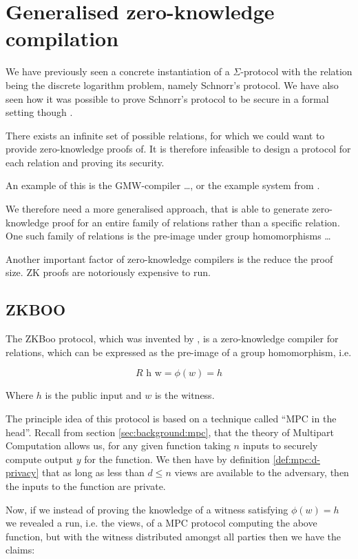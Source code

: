 \chapter{Generalised zero-knowledge compilation}
\label{ch:general_zk}
We have previously seen a concrete instantiation of a $\Sigma$-protocol with the
relation being the discrete logarithm problem, namely Schnorr's protocol. We
have also seen how it was possible to prove Schnorr's protocol to be secure in a
formal setting though \easycrypt.


There exists an infinite set of possible relations, for which we could want to
provide zero-knowledge proofs of. It is therefore infeasible to design a
protocol for each relation and proving its security.

An example of this is the GMW-compiler \dots, or the example system from \cite{zkcrypt}.

We therefore need a more generalised approach, that is able to generate
zero-knowledge proof for an entire family of relations rather than a specific relation.
One such family of relations is the pre-image under group homomorphisms \dots

Another important factor of zero-knowledge compilers is the reduce the proof
size. ZK proofs are notoriously expensive to run.

\section{ZKBOO}
\label{sec:zkboo}
The ZKBoo protocol, which was invented by \citet{zkboo}, is a zero-knowledge compiler for relations, which can be
expressed as the pre-image of a group homomorphism, i.e.

\[
  R \text{ h w} = \phi(w) = h
\]

Where $h$ is the public input and $w$ is the witness.

The principle idea of this protocol is based on a technique called ``MPC in the
head''. Recall from section \ref{sec:background:mpc}, that the theory of
Multipart Computation allows us, for any given function taking $n$ inputs to
securely compute output $y$ for the function. We then have by definition
\ref{def:mpc:d-privacy} that as long as less than $d \leq n$ views are available to the adversary, then the inputs to the function are private.

Now, if we instead of proving the knowledge of a witness satisfying $\phi(w) = h$
we revealed a run, i.e. the views, of a MPC protocol computing the above
function, but with the witness distributed amongst all parties then we have the
claims:

